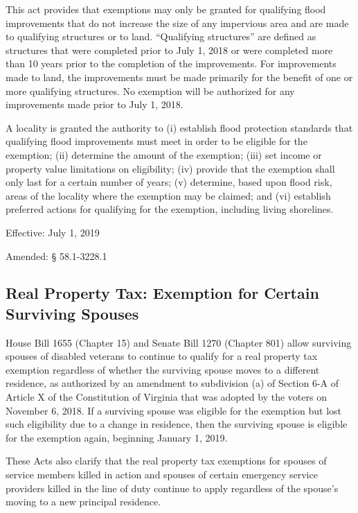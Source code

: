 \documentclass[
]{book}
\begin{document}
This act provides that exemptions may only be granted for qualifying flood improvements that do not increase the size of any impervious area and are made to qualifying structures or to land. ``Qualifying structures'' are defined as structures that were completed prior to July 1, 2018 or were completed more than 10 years prior to the completion of the improvements. For improvements made to land, the improvements must be made primarily for the benefit of one or more qualifying structures. No exemption will be authorized for any improvements made prior to July 1, 2018.

A locality is granted the authority to (i) establish flood protection standards that qualifying flood improvements must meet in order to be eligible for the exemption; (ii) determine the amount of the exemption; (iii) set income or property value limitations on eligibility; (iv) provide that the exemption shall only last for a certain number of years; (v) determine, based upon flood risk, areas of the locality where the exemption may be claimed; and (vi) establish preferred actions for qualifying for the exemption, including living shorelines.

Effective: July 1, 2019

Amended: § 58.1-3228.1

\hypertarget{real-property-tax-exemption-for-certain-surviving-spouses}{%
\subsection{Real Property Tax: Exemption for Certain Surviving Spouses}\label{real-property-tax-exemption-for-certain-surviving-spouses}}

House Bill 1655 (Chapter 15) and Senate Bill 1270 (Chapter 801) allow surviving spouses of disabled veterans to continue to qualify for a real property tax exemption regardless of whether the surviving spouse moves to a different residence, as authorized by an amendment to subdivision (a) of Section 6-A of Article X of the Constitution of Virginia that was adopted by the voters on November 6, 2018. If a surviving spouse was eligible for the exemption but lost such eligibility due to a change in residence, then the surviving spouse is eligible for the exemption again, beginning January 1, 2019.

These Acts also clarify that the real property tax exemptions for spouses of service members killed in action and spouses of certain emergency service providers killed in the line of duty continue to apply regardless of the spouse's moving to a new principal residence.
\end{document}
